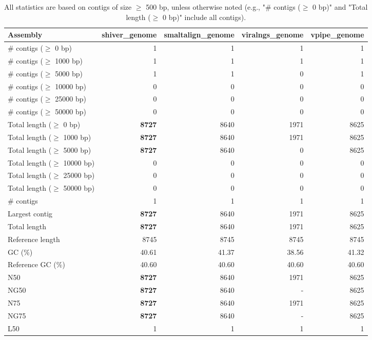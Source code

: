 \documentclass[12pt,a4paper]{article}
\begin{document}
\begin{table}[ht]
\begin{center}
\caption{All statistics are based on contigs of size $\geq$ 500 bp, unless otherwise noted (e.g., "\# contigs ($\geq$ 0 bp)" and "Total length ($\geq$ 0 bp)" include all contigs).}
\begin{tabular}{|l*{4}{|r}|}
\hline
Assembly & shiver\_genome & smaltalign\_genome & viralngs\_genome & vpipe\_genome \\ \hline
\# contigs ($\geq$ 0 bp) & 1 & 1 & 1 & 1 \\ \hline
\# contigs ($\geq$ 1000 bp) & 1 & 1 & 1 & 1 \\ \hline
\# contigs ($\geq$ 5000 bp) & 1 & 1 & 0 & 1 \\ \hline
\# contigs ($\geq$ 10000 bp) & 0 & 0 & 0 & 0 \\ \hline
\# contigs ($\geq$ 25000 bp) & 0 & 0 & 0 & 0 \\ \hline
\# contigs ($\geq$ 50000 bp) & 0 & 0 & 0 & 0 \\ \hline
Total length ($\geq$ 0 bp) & {\bf 8727} & 8640 & 1971 & 8625 \\ \hline
Total length ($\geq$ 1000 bp) & {\bf 8727} & 8640 & 1971 & 8625 \\ \hline
Total length ($\geq$ 5000 bp) & {\bf 8727} & 8640 & 0 & 8625 \\ \hline
Total length ($\geq$ 10000 bp) & 0 & 0 & 0 & 0 \\ \hline
Total length ($\geq$ 25000 bp) & 0 & 0 & 0 & 0 \\ \hline
Total length ($\geq$ 50000 bp) & 0 & 0 & 0 & 0 \\ \hline
\# contigs & 1 & 1 & 1 & 1 \\ \hline
Largest contig & {\bf 8727} & 8640 & 1971 & 8625 \\ \hline
Total length & {\bf 8727} & 8640 & 1971 & 8625 \\ \hline
Reference length & 8745 & 8745 & 8745 & 8745 \\ \hline
GC (\%) & 40.61 & 41.37 & 38.56 & 41.32 \\ \hline
Reference GC (\%) & 40.60 & 40.60 & 40.60 & 40.60 \\ \hline
N50 & {\bf 8727} & 8640 & 1971 & 8625 \\ \hline
NG50 & {\bf 8727} & 8640 & - & 8625 \\ \hline
N75 & {\bf 8727} & 8640 & 1971 & 8625 \\ \hline
NG75 & {\bf 8727} & 8640 & - & 8625 \\ \hline
L50 & 1 & 1 & 1 & 1 \\ \hline

\end{tabular}
\end{center}
\end{table}
\end{document}
